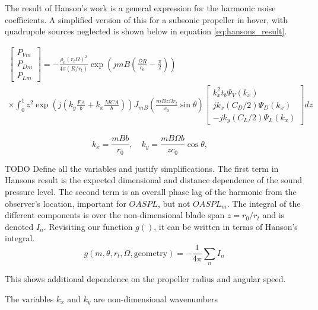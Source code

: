 \documentclass[12pt,a4paper]{article}
\begin{document}
The result of Hanson's work is a general expression for the harmonic noise coefficients.
A simplified version of this for a subsonic propeller in hover, with quadrupole sources neglected is
shown below in equation \ref{eq:hansons_result}.

\begin{equation}
    \begin{aligned}
        \begin{bmatrix}
            P_{Vm} \\
            P_{Dm} \\
            P_{Lm}
        \end{bmatrix} = - \frac{\rho_0 (r_t \Omega)^2}{4\pi (R / r_t)} \exp\left(jmB \left( \frac{\Omega R}{c_0} - \frac{\pi}{2} \right)\right) \\
        \times \int_0^1 z^2 \exp \left(j \left(k_y \frac{FA}{b} + k_x \frac{MCA}{b}\right) \right) J_{mB} \left( \frac{mB z \Omega r_t}{c_0} \sin \theta \right) \begin{bmatrix}
            k_x^2 t_b \Psi_V(k_x) \\
            jk_x (C_D / 2) \Psi_D(k_x) \\
            -jk_y (C_L / 2) \Psi_L(k_x)
        \end{bmatrix}dz
    \end{aligned}
    \label{eq:hansons_result}
\end{equation}

\begin{equation}
    k_x = \frac{mB b}{r_0}, \quad
    k_y = \frac{mB\Omega b}{z c_0} \cos \theta, \quad
\end{equation}

TODO Define all the variables and justify simplifications.
The first term in Hansons result is the expected dimensional and distance dependence of the sound pressure level.
The second term is an overall phase lag of the harmonic from the observer's location, important for $OASPL$, but not $OASPL_m$.
The integral of the different components is over the non-dimensional blade span $z = r_0 / r_t$ and is denoted $I_n$.
Revisiting our function $g()$, it can be written in terms of Hanson's integral.
\begin{equation}
    g(m, \theta, r_t, \Omega, \text{geometry}) = -\frac{1}{4\pi} \sum_n I_n
\end{equation}

This shows additional dependence on the propeller radius and angular speed.

The variables $k_x$ and $k_y$ are non-dimensional wavenumbers
\end{document}
